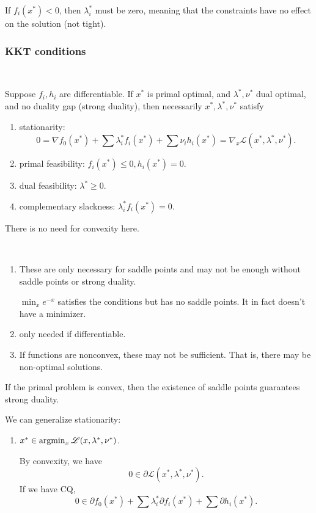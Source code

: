 \documentclass[class=article,crop=false]{standalone}
\begin{document}
If $ f_i(x^* )<0$, then $ \lambda_i^* $ must be zero, meaning that the constraints have no effect on the solution (not tight).

\subsubsection{KKT conditions}
~\begin{thm}
	Suppose $ f_i,h_i$ are differentiable. If $ x^* $ is primal optimal, and $ \lambda^*,\nu^*  $ dual optimal, and no duality gap (strong duality), then necessarily $ x^* ,\lambda^* ,\nu^* $ satisfy
	\begin{enumerate}[label=(\arabic*)]
		\item stationarity: 
			 \[
				 0 = \nabla f_0(x^* ) + \sum \lambda_i^* f_i(x^* ) + \sum \nu_i h_i(x^* ) = \nabla _x \mathscr{L}(x^* ,\lambda^* ,\nu^* )
			.\] 
		\item primal feasibility: $ f_i(x^* )\leq 0, h_i(x^* ) =0$.
		\item dual feasibility: $ \lambda^* \geq 0$.
		\item complementary slackness: $ \lambda_i^* f_i(x^* ) =0$.
	\end{enumerate}
\end{thm}
\begin{note}
There is no need for convexity here.
\end{note}
\begin{remark}
~\begin{enumerate}[label=(\alph*)]
	\item These are only necessary for saddle points and may not be enough without saddle points or strong duality.
		\begin{eg}
		$ \min_x e^{-x}$ satisfies the conditions but has no saddle points. It in fact doesn't have a minimizer. 
		\end{eg}
	\item only needed if differentiable.
	\item If functions are nonconvex, these may not be sufficient. That is, there may be non-optimal solutions.
\end{enumerate}
\end{remark}
\begin{remark}
If the primal problem is convex, then the existence of saddle points guarantees strong duality.
\end{remark}

We can generalize stationarity:
\begin{enumerate}[label=(\arabic*)]
	\item $ x^*  \in \operatorname*{argmin}_x \mathscr{L}(x,\lambda^* ,\nu^* )$.

			By convexity, we have
			\[
				0 \in \partial \mathscr{L}(x^* ,\lambda^* ,\nu^* )
			.\] 
			If we have CQ,
			\[
				0 \in \partial f_0(x^* ) + \sum \lambda_i^* \partial f_i(x^* ) + \sum \partial h_i(x^* )
			.\] 
\end{enumerate}
\end{document}
